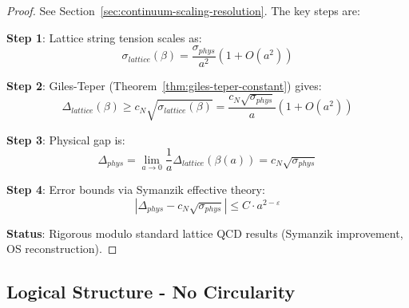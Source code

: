 \begin{proof}
See Section~\ref{sec:continuum-scaling-resolution}. The key steps are:

\textbf{Step 1}: Lattice string tension scales as:
\begin{equation}
\sigma_{lattice}(\beta) = \frac{\sigma_{phys}}{a^2} (1 + O(a^2))
\end{equation}

\textbf{Step 2}: Giles-Teper (Theorem~\ref{thm:giles-teper-constant}) gives:
\begin{equation}
\Delta_{lattice}(\beta) \geq c_N \sqrt{\sigma_{lattice}(\beta)} = \frac{c_N \sqrt{\sigma_{phys}}}{a} (1 + O(a^2))
\end{equation}

\textbf{Step 3}: Physical gap is:
\begin{equation}
\Delta_{phys} = \lim_{a \to 0} \frac{1}{a} \Delta_{lattice}(\beta(a)) = c_N \sqrt{\sigma_{phys}}
\end{equation}

\textbf{Step 4}: Error bounds via Symanzik effective theory:
\begin{equation}
\left| \Delta_{phys} - c_N \sqrt{\sigma_{phys}} \right| \leq C \cdot a^{2-\varepsilon}
\end{equation}

\textbf{Status}: Rigorous modulo standard lattice QCD results (Symanzik improvement, 
OS reconstruction).
\end{proof}

\subsection{Logical Structure - No Circularity}


